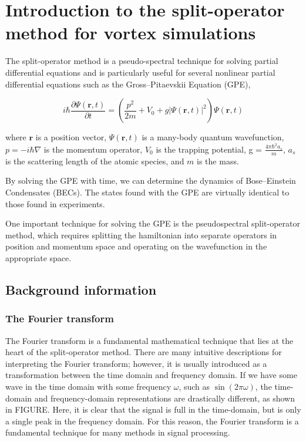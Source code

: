 \chapter{Introduction to the split-operator method for vortex simulations}
\label{ch-splitop}

The split-operator method is a pseudo-spectral technique for solving partial differential equations and is particularly useful for several nonlinear partial differential equations such as the Gross--Pitaevskii Equation (GPE),

$$
i \hbar \frac{\partial \Psi(\mathbf{r},t)}{\partial t} = \left(\frac{p^2}{2m} + V_0 + g |\Psi(\mathbf{r},t)|^2 \right)\Psi(\mathbf{r},t)
$$

where $\mathbf{r}$ is a position vector, $\Psi(\mathbf{r},t)$ is a many-body quantum wavefunction, $p = -i\hbar\nabla$ is the momentum operator, $V_0$ is the trapping potential, g = $\frac{4\pi\hbar^2 a_s}{m}$, $a_s$ is the scattering length of the atomic species, and $m$ is the mass.

By solving the GPE with time, we can determine the dynamics of Bose--Einstein Condensates (BECs).
The states found with the GPE are virtually identical to those found in experiments.

One important technique for solving the GPE is the pseudospectral split-operator method, which requires splitting the hamiltonian into separate operators in position and momentum space and operating on the wavefunction in the appropriate space.

\section{Background information}
\subsection{The Fourier transform}

The Fourier transform is a fundamental mathematical technique that lies at the heart of the split-operator method.
There are many intuitive descriptions for interpreting the Fourier transform; however, it is usually introduced as a transformation between the time domain and frequency domain.
If we have some wave in the time domain with some frequency $\omega$, such as $\sin(2\pi\omega)$, the time-domain and frequency-domain representations are drastically different, as shown in FIGURE.
Here, it is clear that the signal is full in the time-domain, but is only a single peak in the frequency domain.
For this reason, the Fourier transform is a fundamental technique for many methods in signal processing.

